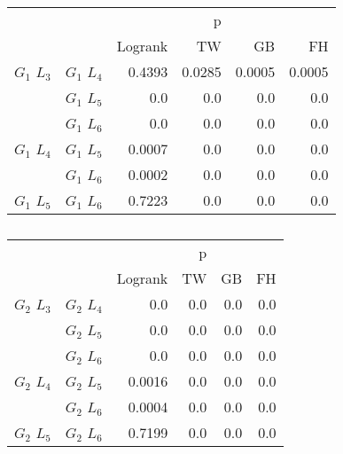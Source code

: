 
       
      \begin{table}
        \centering
        \begin{tabular}{llrrrr}
          \toprule
                       &             &         &  p &    &     \\
          \cmidrule{3-6}
                       &             & Logrank & TW & GB & FH  \\
          \midrule
          $G_1$ $L_3$  & $G_1$ $L_4$  &  0.4393 &  0.0285 &  0.0005 &  0.0005     \\
                       & $G_1$ $L_5$  & 0.0 & 0.0 & 0.0 & 0.0    \\
                       & $G_1$ $L_6$  & 0.0 & 0.0 & 0.0 & 0.0      \\
          $G_1$ $L_4$  & $G_1$ $L_5$  & 0.0007 & 0.0 & 0.0 & 0.0      \\
                       & $G_1$ $L_6$  & 0.0002 & 0.0 & 0.0 & 0.0       \\
          $G_1$ $L_5$   & $G_1$ $L_6$ & 0.7223 &  0.0 & 0.0 & 0.0      \\
          \bottomrule
        \end{tabular}
        \label{tab:g1_ingroup_tests_steps}
        \caption{}
      \end{table}


      \begin{table}
        \centering
        \begin{tabular}{llrrrr}
          \toprule
                       &             &         &  p &    &     \\
          \cmidrule{3-6}
                       &             & Logrank & TW & GB & FH  \\
          \midrule
          $G_2$ $L_3$  & $G_2$ $L_4$  &  0.0 &  0.0 &  0.0 &  0.0     \\
                       & $G_2$ $L_5$  & 0.0 & 0.0 & 0.0 & 0.0    \\
                       & $G_2$ $L_6$  & 0.0 & 0.0 & 0.0 & 0.0      \\
          $G_2$ $L_4$  & $G_2$ $L_5$  & 0.0016 & 0.0 & 0.0 & 0.0      \\
                       & $G_2$ $L_6$  & 0.0004 & 0.0 & 0.0 & 0.0       \\
          $G_2$ $L_5$   & $G_2$ $L_6$ & 0.7199 &  0.0 & 0.0 & 0.0      \\
          \bottomrule
        \end{tabular}
        \label{tab:g2_ingroup_tests_steps}
        \caption{}
      \end{table}




